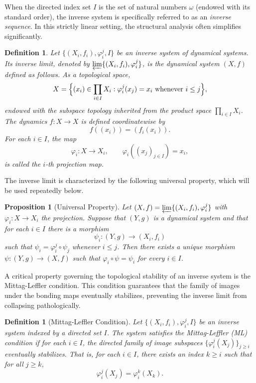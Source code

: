 \documentclass[10pt,a4paper]{amsart}
\newtheorem{proposition}[theorem]{Proposition}
\newtheorem{definition}[theorem]{Definition}
\numberwithin{equation}{section}
\begin{document}
When the directed index set $I$ is the set of natural numbers $\omega$ (endowed with its standard order), the inverse system is specifically referred to as an \emph{inverse sequence}. In this strictly linear setting, the structural analysis often simplifies significantly.

\begin{definition}
Let $\{(X_i,f_i),\varphi_i^j, I\}$ be an inverse system of dynamical systems.
Its \emph{inverse limit}, denoted by
$\varprojlim \{(X_i,f_i),\varphi_i^j\}$, is the dynamical system $(X,f)$
defined as follows. As a topological space,
\[
X=
\Bigl\{
(x_i)\in \prod_{i\in I}X_i :
\varphi_i^j(x_j)=x_i
\text{ whenever } i\le j
\Bigr\},
\]
endowed with the subspace topology inherited from the product space
$\prod_{i\in I}X_i$. The dynamics $f:X\to X$ is defined coordinatewise by
\[
    f((x_i))=(f_i(x_i)).
\]
For each $i\in I$, the map
\[
    \varphi_i:X\to X_i,\qquad \varphi_i((x_j)_{j\in I})=x_i,
\]
is called the \emph{$i$-th projection map}.
\end{definition}

The inverse limit is characterized by the following universal property, which
will be used repeatedly below.

\begin{proposition}[Universal Property]\label{prop:universal}
Let $(X,f)=\varprojlim \{(X_i,f_i),\varphi_i^j\}$ with $\varphi_i: X\to X_i$ the projection. Suppose that $(Y,g)$ is a dynamical system and that for each $i\in I$ there is a morphism
\[
\psi_i:(Y,g)\to (X_i,f_i)
\]
such that $\psi_i = \varphi_i^j\circ \psi_j$ whenever $i\le j$. Then there exists a unique morphism $\psi:(Y,g)\to (X,f)$ such that $\varphi_i\circ \psi=\psi_i$ for every $i\in I$.
\end{proposition}

A critical property governing the topological stability of an inverse system is the Mittag-Leffler condition. This condition guarantees that the family of images under the bonding maps eventually stabilizes, preventing the inverse limit from collapsing pathologically.

\begin{definition}[Mittag-Leffler Condition]
Let $\{(X_i,f_i),\varphi_i^j, I\}$ be an inverse system indexed by a directed set $I$. The system satisfies the \emph{Mittag-Leffler (ML) condition} if for each $i \in I$, the directed family of image subspaces $\{\varphi_i^j(X_j)\}_{j \ge i}$ eventually stabilizes. That is, for each $i \in I$, there exists an index $k \ge i$ such that for all $j \ge k$,
\[
\varphi_i^j(X_j) = \varphi_i^k(X_k).
\]
\end{definition}
\end{document}
